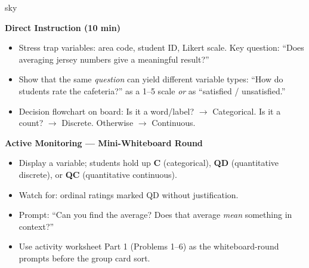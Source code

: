 \documentclass[10pt]{article}
\begin{document}
\begin{skillbox}{sky}
\begin{minipage}[t]{0.48\linewidth}
    \textbf{Direct Instruction (10 min)}
    \begin{itemize}
        \item Stress trap variables: area code, student ID, Likert scale.
              Key question: ``Does averaging jersey numbers give a meaningful result?''
        \item Show that the same \textit{question} can yield different variable
              types: ``How do students rate the cafeteria?'' as a 1--5 scale
              \textit{or} as ``satisfied / unsatisfied.''
        \item Decision flowchart on board: Is it a word/label?
              $\to$ Categorical. Is it a count?
              $\to$ Discrete. Otherwise $\to$ Continuous.
    \end{itemize}
\end{minipage}
\hfill
\begin{minipage}[t]{0.48\linewidth}
    \textbf{Active Monitoring --- Mini-Whiteboard Round}
    \begin{itemize}
        \item Display a variable; students hold up \textbf{C} (categorical),
              \textbf{QD} (quantitative discrete), or \textbf{QC}
              (quantitative continuous).
        \item Watch for: ordinal ratings marked QD without justification.
        \item Prompt: ``Can you find the average? Does that average
              \textit{mean} something in context?''
        \item Use activity worksheet Part 1 (Problems 1--6) as the
              whiteboard-round prompts before the group card sort.
    \end{itemize}
\end{minipage}
\end{skillbox}
\end{document}
